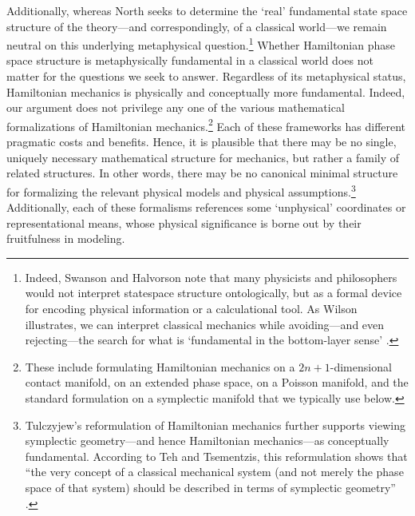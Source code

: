 \documentclass[12pt, english, twoside]{article} %
\begin{document}
Additionally, whereas North \parencites*[76]{North} seeks to determine the `real' fundamental state space structure of the theory---and correspondingly, of a classical world---we remain neutral on this underlying metaphysical question.\footnote{Indeed, Swanson and Halvorson \parencites*[]{Swanson} note that many physicists and philosophers would not interpret statespace structure ontologically, but as a formal device for encoding physical information or a calculational tool. As Wilson illustrates, we can interpret classical mechanics while avoiding---and even rejecting---the search for what is `fundamental in the bottom-layer sense' \parencites*[53]{Wilson}.} Whether Hamiltonian phase space structure is metaphysically fundamental in a classical world does not matter for the questions we seek to answer. Regardless of its metaphysical status, Hamiltonian mechanics is physically and conceptually more fundamental. Indeed, our argument does not privilege any one of the various mathematical formalizations of Hamiltonian mechanics.\footnote{These include formulating Hamiltonian mechanics on a $2n+1$-dimensional contact manifold, on an extended phase space, on a Poisson manifold, and the standard formulation on a symplectic manifold that we typically use below.} Each of these frameworks has different pragmatic costs and benefits. Hence, it is plausible that there may be no single, uniquely necessary mathematical structure for mechanics, but rather a family of related structures. In other words, there may be no canonical minimal structure for formalizing the relevant physical models and physical assumptions.\footnote{Tulczyjew's reformulation of Hamiltonian mechanics further supports viewing symplectic geometry---and hence Hamiltonian mechanics---as conceptually fundamental. According to Teh and Tsementzis, this reformulation shows that  ``the very concept of a classical mechanical system (and not merely the phase space of that system) should be described in terms of symplectic geometry'' \parencites*[46]{Teh}.}  Additionally, each of these formalisms references some `unphysical' coordinates or representational means, whose physical significance is borne out by their fruitfulness in modeling.
\end{document}

